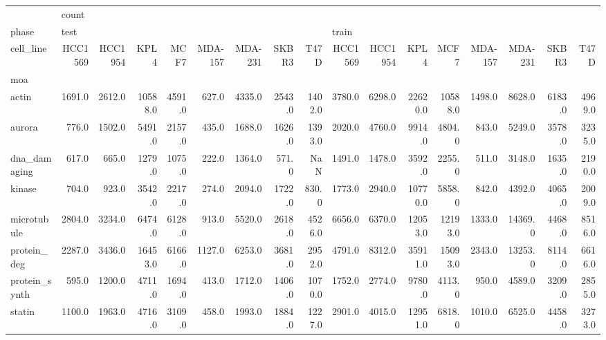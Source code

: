 \begin{tabular}{lrrrrrrrrrrrrrrrr}
\toprule
{} & \multicolumn{16}{l}{count} \\
phase & \multicolumn{8}{l}{test} & \multicolumn{8}{l}{train} \\
cell\_line & HCC1569 & HCC1954 &     KPL4 &    MCF7 & MDA-157 & MDA-231 &   SKBR3 &    T47D & HCC1569 & HCC1954 &     KPL4 &     MCF7 & MDA-157 &  MDA-231 &   SKBR3 &    T47D \\
moa           &         &         &          &         &         &         &         &         &         &         &          &          &         &          &         &         \\
\midrule
actin         &  1691.0 &  2612.0 &  10588.0 &  4591.0 &   627.0 &  4335.0 &  2543.0 &  1402.0 &  3780.0 &  6298.0 &  22620.0 &  10588.0 &  1498.0 &   8628.0 &  6183.0 &  4969.0 \\
aurora        &   776.0 &  1502.0 &   5491.0 &  2157.0 &   435.0 &  1688.0 &  1626.0 &  1393.0 &  2020.0 &  4760.0 &   9914.0 &   4804.0 &   843.0 &   5249.0 &  3578.0 &  3235.0 \\
dna\_damaging  &   617.0 &   665.0 &   1279.0 &  1075.0 &   222.0 &  1364.0 &   571.0 &     NaN &  1491.0 &  1478.0 &   3592.0 &   2255.0 &   511.0 &   3148.0 &  1635.0 &  2190.0 \\
kinase        &   704.0 &   923.0 &   3542.0 &  2217.0 &   274.0 &  2094.0 &  1722.0 &   830.0 &  1773.0 &  2940.0 &  10770.0 &   5858.0 &   842.0 &   4392.0 &  4065.0 &  2009.0 \\
microtubule   &  2804.0 &  3234.0 &   6474.0 &  6128.0 &   913.0 &  5520.0 &  2618.0 &  4526.0 &  6656.0 &  6370.0 &  12053.0 &  12193.0 &  1333.0 &  14369.0 &  4468.0 &  8516.0 \\
protein\_deg   &  2287.0 &  3436.0 &  16453.0 &  6166.0 &  1127.0 &  6253.0 &  3681.0 &  2952.0 &  4791.0 &  8312.0 &  35911.0 &  15093.0 &  2343.0 &  13253.0 &  8114.0 &  6616.0 \\
protein\_synth &   595.0 &  1200.0 &   4711.0 &  1694.0 &   413.0 &  1712.0 &  1406.0 &  1070.0 &  1752.0 &  2774.0 &   9780.0 &   4113.0 &   950.0 &   4589.0 &  3209.0 &  2855.0 \\
statin        &  1100.0 &  1963.0 &   4716.0 &  3109.0 &   458.0 &  1993.0 &  1884.0 &  1227.0 &  2901.0 &  4015.0 &  12951.0 &   6818.0 &  1010.0 &   6525.0 &  4458.0 &  3273.0 \\
\bottomrule
\end{tabular}
